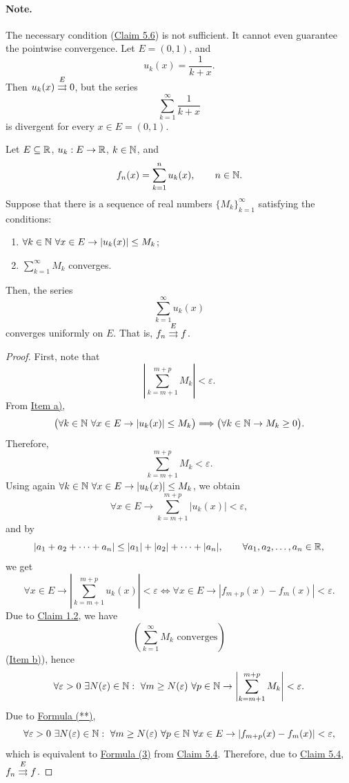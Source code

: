 \paragraph{Note.}
The necessary condition (\hyperref[claim:5.6]{Claim 5.6}) is not sufficient. It cannot even guarantee the pointwise convergence.
Let $E=(0,1)$, and
\[
u_k(x)=\frac{1}{k+x}.
\]
Then $u_k(x)\mathrel{\overset{E}{\rightrightarrows}}0$, but the series
\[
\sum_{k=1}^{\infty}\frac{1}{k+x}
\]
is divergent for every $x\in E=(0,1)$.

\begin{claim}\label{claim:5.7}
Let $E\subseteq\mathbb{R}$, $u_k:E\to\mathbb{R}$, $k\in\mathbb{N}$, and
\[
f_n(x)=\sum_{k=1}^{n}u_k(x),\qquad n\in\mathbb{N}.
\]
Suppose that there is a sequence of real numbers $\{M_k\}_{k=1}^{\infty}$ satisfying the conditions:
\begin{enumerate}[label=\alph*)]
    \item\label{item:claim:5.7:a} $\forall k\in\mathbb{N}\ \forall x\in E\to |u_k(x)|\le M_k$;
    \item\label{item:claim:5.7:b} $\displaystyle\sum_{k=1}^{\infty}M_k$ converges.
\end{enumerate}
Then, the series
\[
\sum_{k=1}^{\infty}u_k(x)
\]
converges uniformly on $E$.
That is, $f_n\mathrel{\overset{E}{\rightrightarrows}}f$.
\end{claim}

\begin{proof}
First, note that
\[
\left|\sum_{k=m+1}^{m+p}M_k\right|<\varepsilon.
\]
From \hyperref[item:claim:5.7:a]{Item a)},
\[
\bigl(\forall k\in\mathbb{N}\ \forall x\in E\to |u_k(x)|\le M_k\bigr)
\Longrightarrow
\bigl(\forall k\in\mathbb{N}\to M_k\ge0\bigr).
\]
Therefore,
\[
\sum_{k=m+1}^{m+p}M_k<\varepsilon.
\]
Using again $\forall k\in\mathbb{N}\ \forall x\in E\to |u_k(x)|\le M_k$, we obtain
\[
\forall x\in E\to\sum_{k=m+1}^{m+p}|u_k(x)|<\varepsilon,
\]
and by
\[
|a_1+a_2+\cdots+a_n|\le|a_1|+|a_2|+\cdots+|a_n|,
\qquad \forall a_1,a_2,\ldots,a_n\in\mathbb{R},
\]
we get
\[
\forall x\in E\to
\left|\sum_{k=m+1}^{m+p}u_k(x)\right|<\varepsilon
\Longleftrightarrow
\forall x\in E\to |f_{m+p}(x)-f_m(x)|<\varepsilon.
\tag{**}\label{eq:5:starstar:1}
\]
Due to \hyperref[claim:1.2]{Claim 1.2}, we have
\[
\left(\sum_{k=1}^{\infty}M_k\text{ converges}\right)
\]
(\hyperref[item:claim:5.7:b]{Item b)}), hence
\[
\forall\varepsilon>0\ \exists N(\varepsilon)\in\mathbb{N}:\ \forall m\ge N(\varepsilon)\ \forall p\in\mathbb{N}
\to \left|\sum_{k=m+1}^{m+p}M_k\right|<\varepsilon.
\]
Due to \hyperref[eq:5:starstar:1]{Formula (**)},
\[
\forall\varepsilon>0\ \exists N(\varepsilon)\in\N:\ \forall m\ge N(\varepsilon)\ \forall p\in\N\ \forall x\in E
\to |f_{m+p}(x)-f_m(x)|<\varepsilon,
\]
which is equivalent to \hyperref[eq:5:3:1]{Formula (3)} from \hyperref[claim:5.4]{Claim 5.4}.
Therefore, due to \hyperref[claim:5.4]{Claim 5.4}, $f_n\mathrel{\overset{E}{\rightrightarrows}}f$.
\end{proof}

